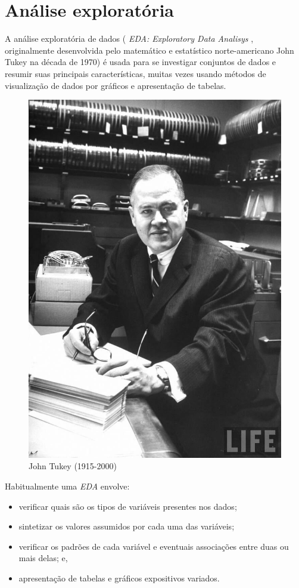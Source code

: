 \documentclass[
]{book}
\providecommand{\tightlist}{%
  \setlength{\itemsep}{0pt}\setlength{\parskip}{0pt}}
\begin{document}
\hypertarget{anuxe1lise-exploratuxf3ria}{%
\section{Análise exploratória}\label{anuxe1lise-exploratuxf3ria}}

A análise exploratória de dados ( \emph{EDA: Exploratory Data Analisys} , originalmente desenvolvida pelo matemático e estatístico norte-americano John Tukey na década de 1970) é usada para se investigar conjuntos de dados e resumir suas principais características, muitas vezes usando métodos de visualização de dados por gráficos e apresentação de tabelas.

\hfill\break

\begin{figure}

{\centering \includegraphics[width=0.5\linewidth]{images3/tukey} 

}

\caption{John Tukey (1915-2000)}\label{fig:unnamed-chunk-29}
\end{figure}

\hfill\break

Habitualmente uma \emph{EDA} envolve:

\begin{itemize}
\tightlist
\item
  verificar quais são os tipos de variáveis presentes nos dados;
\item
  sintetizar os valores assumidos por cada uma das variáveis;
\item
  verificar os padrões de cada variável e eventuais associações entre duas ou mais delas; e,
\item
  apresentação de tabelas e gráficos expositivos variados.
\end{itemize}
\end{document}
